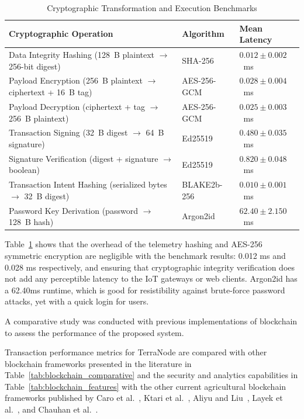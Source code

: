 \begin{table}[H]
\centering
\small
\singlespacing
\renewcommand{\arraystretch}{1.15}
\caption{Cryptographic Transformation and Execution Benchmarks}
\label{tab:crypto_benchmarks}
\begin{tabularx}{\textwidth}{|>{\raggedright\arraybackslash}X|l|l|}
\hline
\textbf{Cryptographic Operation} & \textbf{Algorithm} & \textbf{Mean Latency} \\
\hline
Data Integrity Hashing (128~B plaintext $\to$ 256-bit digest) & SHA-256 & $0.012 \pm 0.002$~ms \\
\hline
Payload Encryption (256~B plaintext $\to$ ciphertext + 16~B tag) & AES-256-GCM & $0.028 \pm 0.004$~ms \\
\hline
Payload Decryption (ciphertext + tag $\to$ 256~B plaintext) & AES-256-GCM & $0.025 \pm 0.003$~ms \\
\hline
Transaction Signing (32~B digest $\to$ 64~B signature) & Ed25519 & $0.480 \pm 0.035$~ms \\
\hline
Signature Verification (digest + signature $\to$ boolean) & Ed25519 & $0.820 \pm 0.048$~ms \\
\hline
Transaction Intent Hashing (serialized bytes $\to$ 32~B digest) & BLAKE2b-256 & $0.010 \pm 0.001$~ms \\
\hline
Password Key Derivation (password $\to$ 128~B hash) & Argon2id & $62.40 \pm 2.150$~ms \\
\hline
\end{tabularx}
\end{table}

Table~\ref{tab:crypto_benchmarks} shows that the overhead of the telemetry hashing and AES-256 symmetric encryption are negligible with the benchmark results: 0.012 ms and 0.028 ms respectively, and ensuring that cryptographic integrity verification does not add any perceptible latency to the IoT gateways or web clients. Argon2id has a 62.40ms runtime, which is good for resistibility against brute-force password attacks, yet with a quick login for users.

A comparative study was conducted with previous implementations of blockchain to assess the performance of the proposed system.

Transaction performance metrics for TerraNode are compared with other blockchain frameworks presented in the literature in Table~\ref{tab:blockchain_comparative} and the security and analytics capabilities in Table~\ref{tab:blockchain_features} with the other current agricultural blockchain frameworks published by Caro et al.~\parencite{caro2018blockchain}, Ktari et al.~\parencite{ktari2022agricultural}, Aliyu and Liu~\parencite{aliyu2023blockchain}, Layek et al.~\parencite{layek2025secured}, and Chauhan et al.~\parencite{chauhan2025blockchain}.

